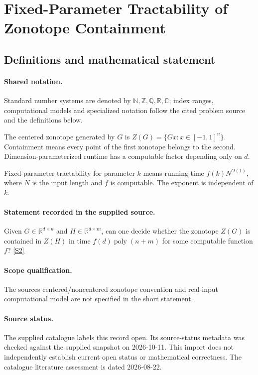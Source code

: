 \documentclass[11pt]{article}
\newcommand{\sref}[2]{\hyperlink{source:#1:#2}{[S#2]}}
\begin{document}
\section{Fixed-Parameter Tractability of Zonotope Containment}\label{statement}

\subsection{Definitions and mathematical statement}

\paragraph{Shared notation.}Standard number systems are denoted by $\mathbb N,\mathbb Z,\mathbb Q,\mathbb R,\mathbb C$; index ranges, computational models and specialized notation follow the cited problem source and the definitions below.


The centered zonotope generated by $G$ is $Z(G)=\{Gx:x\in[-1,1]^n\}$. Containment means every point of the first zonotope belongs to the second. Dimension-parameterized runtime has a computable factor depending only on $d$.

Fixed-parameter tractability for parameter $k$ means running time $f(k)N^{O(1)}$, where $N$ is the input length and $f$ is computable. The exponent is independent of $k$.
\paragraph{Statement recorded in the supplied source.}
Given $G\in\mathbb R^{d\times n}$ and $H\in\mathbb R^{d\times m}$, can one decide whether the zonotope $Z(G)$ is contained in $Z(H)$ in time $f(d)\operatorname{poly}(n+m)$ for some computable function $f$? \sref{statement}{2}
\paragraph{Scope qualification.}
The source\textquotesingle s centered/noncentered zonotope convention and real-input computational model are not specified in the short statement.
\paragraph{Source status.}
The supplied catalogue labels this record open. Its source-status metadata was checked against the supplied snapshot on 2026-10-11. This import does not independently establish current open status or mathematical correctness. The catalogue literature assessment is dated 2026-08-22.
\end{document}
